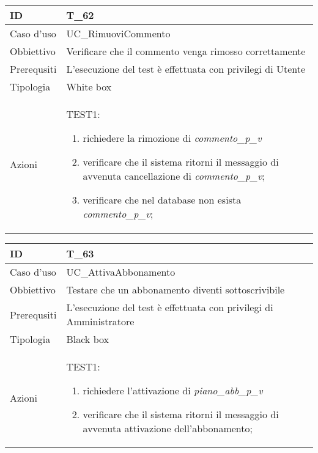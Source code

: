 \begin{table}[hb]
    \centering
    \begin{tabular}{ |p{2cm}|p{10cm}|  }
        \hline
        ID          & T\_62                                                              \\\hline
        Caso d'uso  & UC\_RimuoviCommento                                             \\\hline
        Obbiettivo  & Verificare che il commento venga rimosso correttamente             \\\hline
        Prerequsiti & L'esecuzione del test è effettuata con privilegi di Utente \\\hline
        Tipologia   & White box                                                          \\\hline
        Azioni      &
        TEST1:
        \begin{enumerate}[nosep, topsep=0pt]
            \item richiedere la rimozione di \emph{commento\_p\_v}
            \item verificare che il sistema ritorni il messaggio di avvenuta cancellazione di \emph{commento\_p\_v};
            \item verificare che nel database non esista \emph{commento\_p\_v};
        \end{enumerate}
        \\\hline
    \end{tabular}
\end{table}


\begin{table}[hb]
    \centering
    \begin{tabular}{ |p{2cm}|p{10cm}|  }
        \hline
        ID          & T\_63                                                              \\\hline
        Caso d'uso  & UC\_AttivaAbbonamento                                           \\\hline
        Obbiettivo  & Testare che un abbonamento diventi sottoscrivibile             \\\hline
        Prerequsiti & L'esecuzione del test è effettuata con privilegi di Amministratore \\\hline
        Tipologia   & Black box                                                          \\\hline
        Azioni      &
        TEST1:
        \begin{enumerate}[nosep, topsep=0pt]
            \item richiedere l'attivazione di \emph{piano\_abb\_p\_v}
            \item verificare che il sistema ritorni il messaggio di avvenuta attivazione dell'abbonamento;
        \end{enumerate}
        \\\hline
    \end{tabular}
\end{table}